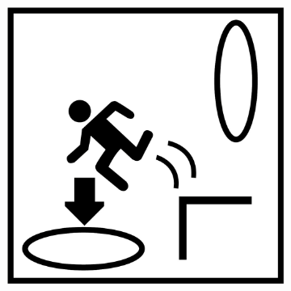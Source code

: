 \begin{figure}[H]
\begin{subfigure}[l]{0.195\linewidth}
  \end{subfigure}
  \begin{subfigure}[l]{0.195\linewidth}
    \includegraphics[width=\textwidth]{Sources/PortalIcons/5.jpg}
  \end{subfigure}
  
  \vspace{1mm}
  

\end{figure}
